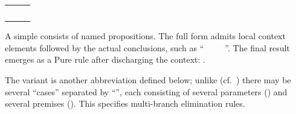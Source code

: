 \begin{isabellebody}
\begin{isamarkuptext}
\begin{tabular}{rcl}
  \isa{{\isachardoublequote}context{\isachardoublequote}} & \isa{{\isachardoublequote}{\isasymequiv}{\isachardoublequote}} & \isa{{\isachardoublequote}{\isasymFIXES}\ vars\ {\isasymAND}\ {\isasymdots}{\isachardoublequote}} \\
  & \isa{{\isachardoublequote}{\isacharbar}{\isachardoublequote}} & \isa{{\isachardoublequote}{\isasymASSUMES}\ name{\isacharcolon}\ props\ {\isasymAND}\ {\isasymdots}{\isachardoublequote}} \\

  \isa{{\isachardoublequote}conclusion{\isachardoublequote}} & \isa{{\isachardoublequote}{\isasymequiv}{\isachardoublequote}} & \isa{{\isachardoublequote}{\isasymSHOWS}\ name{\isacharcolon}\ props\ {\isasymAND}\ {\isasymdots}{\isachardoublequote}} \\
  & \isa{{\isachardoublequote}{\isacharbar}{\isachardoublequote}} & \isa{{\isachardoublequote}{\isasymOBTAINS}\ vars\ {\isasymAND}\ {\isasymdots}\ {\isasymWHERE}\ name{\isacharcolon}\ props\ {\isasymAND}\ {\isasymdots}{\isachardoublequote}} \\
  & & \quad \isa{{\isachardoublequote}{\isasymBBAR}\ {\isasymdots}{\isachardoublequote}} \\
  \end{tabular}

  \medskip\noindent A simple  consists of named
  propositions.  The full form admits local context elements followed
  by the actual conclusions, such as ``\hyperlink{keyword.fixes}{\mbox{}}~~\hyperlink{keyword.assumes}{\mbox{}}~~\hyperlink{keyword.shows}{\mbox{}}~''.  The final result emerges as a Pure rule after discharging
  the context: .

  The \hyperlink{keyword.obtains}{\mbox{}} variant is another abbreviation defined
  below; unlike \hyperlink{command.obtain}{\mbox{}} (cf.\
  ) there may be several ``cases''
  separated by ``\isa{{\isachardoublequote}{\isasymBBAR}{\isachardoublequote}}'', each consisting of several
  parameters (\isa{{\isachardoublequote}vars{\isachardoublequote}}) and several premises ().
  This specifies multi-branch elimination rules.


\end{isamarkuptext}
\end{isabellebody}
